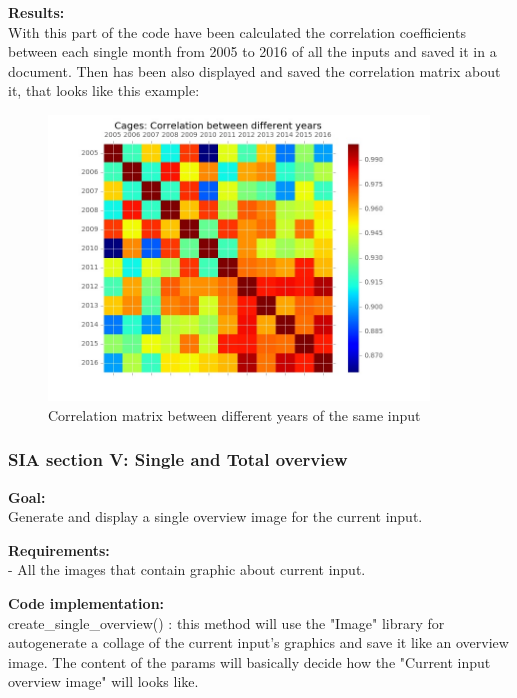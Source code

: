 \begin{minipage}{0.5\textwidth}
\textbf{Results:} \\
With this part of the code have been calculated the correlation coefficients between each single month from 2005 to 2016 of all the inputs and saved it in a document. Then has been also displayed and saved the correlation matrix about it, that looks like this example:
\end{minipage} \hfill
\begin{minipage}{0.45\textwidth}
\begin{figure}[H]
    \includegraphics[width=0.9\textwidth]{Files/Cages_Years_Matrix.jpg}
    \caption{Correlation matrix between different years of the same input}
\end{figure}
\end{minipage}

\newpage
\subsubsection{SIA section V: Single and Total overview}

\textbf{Goal:}\\
Generate and display a single overview image for the current input.

\textbf{Requirements:}\\
- All the images that contain graphic about current input.

\textbf{Code implementation:}\\
create\_single\_overview() : this method will use the "Image" library for autogenerate a collage of the current input's graphics and save it like an overview image. The content of the params will basically decide how the "Current input overview image" will looks like.

